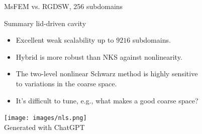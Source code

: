 \begin{frame}{MsFEM vs. RGDSW, 256 subdomains}
	\begin{figure}
		\centering
		
		\label{fig:msfem-vs-rgdsw}
	\end{figure}
\end{frame}

\begin{frame}{Summary lid-driven cavity}
	\begin{itemize}
		\item Excellent weak scalability up to $9216$ subdomains. %
		\item Hybrid is more robust than NKS against nonlinearity.
		\item The two-level nonlinear Schwarz method is highly sensitive\\to variations in the coarse space.
		\item It's difficult to tune, e.g., what makes a good coarse space?%
	\end{itemize}
	\vspace{2mm}
	\begin{center}
		\texttt{[image: images/nls.png]}\\
		{\tiny \vspace{-2mm}\hspace{-4.6cm}Generated with ChatGPT}
	\end{center}
\end{frame}
